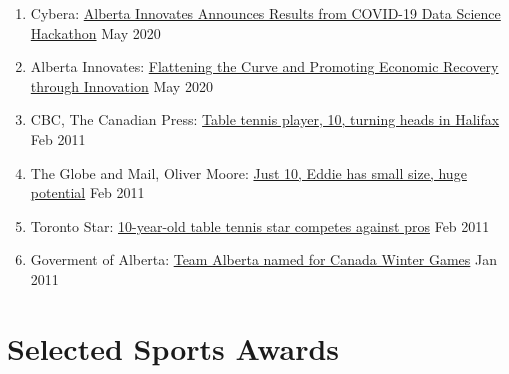 \documentclass{article}
\begin{document}
\begin{enumerate}
    \item Cybera: \href{https://www.cybera.ca/covid-19-data-science-hackathon-winners/}{Alberta Innovates Announces Results from COVID-19 Data Science Hackathon} \hfill May 2020
    \item Alberta Innovates: \href{https://albertainnovates.ca/news/flattening-the-curve-and-promoting-economic-recovery-through-innovation/}{Flattening the Curve and Promoting Economic Recovery through Innovation} \hfill May 2020
    \item CBC, The Canadian Press: \href{https://www.cbc.ca/sports/2.723/table-tennis-player-10-turning-heads-in-halifax-1.1115785}{Table tennis player, 10, turning heads in Halifax} \hfill Feb 2011
    \item The Globe and Mail, Oliver Moore: \href{https://www.theglobeandmail.com/sports/more-sports/just-10-eddie-has-small-size-huge-potential/article567766/}{Just 10, Eddie has small size, huge potential} \hfill Feb 2011
    \item Toronto Star: \href{https://www.thestar.com/sports/10-year-old-table-tennis-star-competes-against-pros/article_6446b8a8-d20c-5a5b-99d4-c7a19640d067.html}{10-year-old table tennis star competes against pros} \hfill Feb 2011
    \item Goverment of Alberta: \href{https://www.alberta.ca/release.cfm?xID=297919A1CA1D0-A726-5DBB-1FF85C24472CEF84}{Team Alberta named for Canada Winter Games} \hfill Jan 2011
\end{enumerate}

\section*{\textcolor{my_colour}{Selected Sports Awards}}
\vspace{-.25em} \hrulefill \vspace{.25em}
\end{document}
